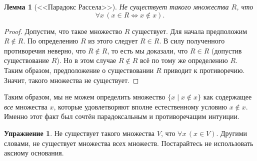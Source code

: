 \documentclass[12pt,notitlepage]{article}
\theoremstyle{plain}
\newtheorem{lemma}[thm]{Лемма}
\theoremstyle{definition}
\newtheorem{exc}[thm]{Упражнение}
\theoremstyle{plain}
\newcommand{\1}{\mathbf{1}}
\newcommand{\0}{\mathbf{0}}
\newcommand{\mcomm}[1]{}
\begin{document}
\begin{lemma}[<<Парадокс Рассела>>]
	Не существует такого множества $R$, что
	$$\forall x\, (x \in R \iff x \notin x).$$
\end{lemma}
\begin{proof}
	Допустим, что такое множество $R$ существует. Для начала предположим $R \notin R$. По определению $R$ из этого следует $R \in R$. В силу полученного противоречия неверно, что $R \notin R$, то есть мы доказали, что $R \in R$ (допустив существование $R$). Но в этом случае $R \notin R$ всё по тому же определению $R$. Таким образом, предположение о существовании $R$ приводит к противоречию. Значит, такого множества не существует.
\end{proof}

Таким образом, мы не можем определить множество $\{x \mid x \notin x \}$ как содержащее \emph{все} множества $x$, которые удовлетворяют вполне естественному условию $x \notin x$. Именно этот факт был сочтён парадоксальным и противоречащим интуиции.

\mcomm{In view of the Axiom of Foundation, $R$ is \emph{the set of all sets}, which does not thus exist. The Instructor might ask the students to prove the latter statement \emph{without} that axiom and might then explain why proofs from \emph{weaker} assumptions (even the ``axioms'') are usually worth looking for.}
\begin{exc}
	Не существует такого множества $V$, что
	$\forall x\, (x \in V).$
	Другими словами, не существует множества всех множеств. Постарайтесь не использовать аксиому основания.
\end{exc}
%
\end{document}
